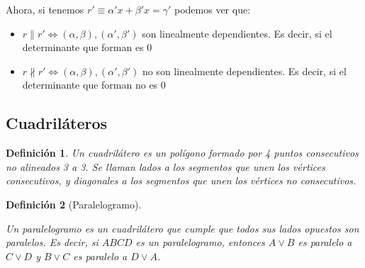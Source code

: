\documentclass[11pt, a4paper]{article}
\newif\IfInSansMode
\let\oldsf\sffamily
\renewcommand*{\sffamily}{\oldsf\mathversion{sans}\InSansModetrue}
\theoremstyle{theorem-style}
\theoremstyle{definition-style}
\newtheorem{ndef}{Definición}[section]
\theoremstyle{remark-style}
\theoremstyle{example-style}
\begin{document}
Ahora, si tenemos $r'\equiv \alpha' x + \beta' x = \gamma '$ podemos ver que:
\begin{itemize}
\item $r \parallel r' \iff (\alpha,\beta), (\alpha',\beta') $ son linealmente dependientes. Es decir, si el determinante que forman es $0$

\item $r \nparallel r'\iff (\alpha,\beta), (\alpha',\beta') $ no son linealmente dependientes. Es decir, si el determinante que forman no es $0$
\end{itemize}

\subsection{Cuadriláteros}

\begin{ndef}
  Un cuadrilátero es un polígono formado por 4 puntos consecutivos no alineados 3 a 3. Se llaman \textit{lados} a los segmentos que unen los vértices consecutivos, y \textit{diagonales} a los segmentos que unen los vértices no consecutivos.
\end{ndef}

\begin{ndef}[Paralelogramo]\hfill\\
\begin{minipage}[c]{0.70\textwidth}
  Un paralelogramo es un cuadrilátero que cumple que todos sus lados opuestos son paralelos. Es decir, si $ABCD$ es un
  paralelogramo, entonces $A \vee B$ es paralelo a $C \vee D$ y $B \vee C$ es paralelo a $D \vee A$.
\end{minipage}\hfill
\begin{minipage}[]{0.27\textwidth}
  \sffamily
\end{minipage}
\end{ndef}
\end{document}
